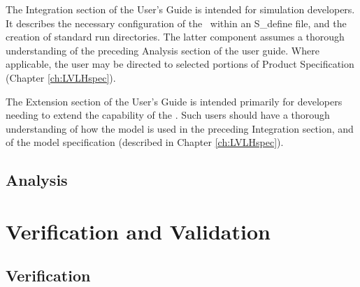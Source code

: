 The Integration section of the User's Guide is intended for simulation
developers.
It describes the necessary configuration of the \LVLHDesc\
within an
S\_define file, and the creation of standard run directories.  The
latter
component assumes a thorough understanding of the preceding Analysis
section of the user guide.
Where applicable, the user may be directed to selected portions of
Product Specification (Chapter \ref{ch:LVLHspec}).

The Extension section of the User's Guide is intended primarily for
developers
needing to extend the capability of the \LVLHDesc.  Such users
should have a
thorough understanding of how the model is used in the preceding
Integration section, and of the model
specification (described in Chapter \ref{ch:LVLHspec}).


\section{Analysis}






\chapter{Verification and
Validation}\label{ch:LVLHivv}

\section{Verification}





